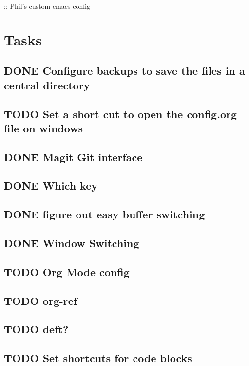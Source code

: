 \documentclass[11pt]{article}
\author{Phil McCredden}
\date{\today}
\title{}
\begin{document}
\tableofcontents

;; Phil's custom emacs config

\section{Tasks}
\label{sec:orgd960f90}
\subsection{{\bfseries\sffamily DONE} Configure backups to save the files in a central directory}
\label{sec:org87a3692}
\subsection{{\bfseries\sffamily TODO} Set a short cut to open the config.org file on windows}
\label{sec:orga51d3d3}
\subsection{{\bfseries\sffamily DONE} Magit Git interface}
\label{sec:orgf6966ff}
\subsection{{\bfseries\sffamily DONE} Which key}
\label{sec:org032d6cf}
\subsection{{\bfseries\sffamily DONE} figure out easy buffer switching}
\label{sec:org8038bfc}
\subsection{{\bfseries\sffamily DONE} Window Switching}
\label{sec:orgf2ab247}
\subsection{{\bfseries\sffamily TODO} Org Mode config}
\label{sec:org3474b91}
\subsection{{\bfseries\sffamily TODO} org-ref}
\label{sec:org936dfe3}

\subsection{{\bfseries\sffamily TODO} deft?}
\label{sec:org7b5c1a9}
\subsection{{\bfseries\sffamily TODO} Set shortcuts for code blocks}
\label{sec:orgb62b812}
\end{document}
